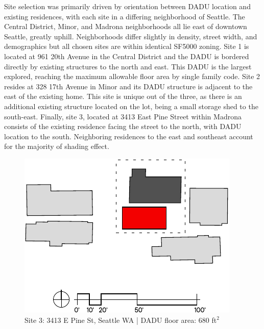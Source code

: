 \documentclass[sagev,times,Royal]{sagej}
\begin{document}
Site selection was primarily driven by orientation between DADU location and existing residences, with each site in a differing neighborhood of Seattle. The Central District, Minor, and Madrona neighborhoods all lie east of downtown Seattle, greatly uphill. Neighborhoods differ slightly in density, street width, and demographics but all chosen sites are within identical SF5000 zoning. Site 1 is located at 961 20th Avenue in the Central District and the DADU is bordered directly by existing structures to the north and east. This DADU is the largest explored, reaching the maximum allowable floor area by single family code\cite{ADUniverseADURules}. Site 2 resides at 328 17th Avenue in Minor and its DADU structure is adjacent to the east of the existing home. This site is unique out of the three, as there is an additional existing structure located on the lot, being a small storage shed to the south-east. Finally, site 3, located at 3413 East Pine Street within Madrona consists of the existing residence facing the street to the north, with DADU location to the south. Neighboring residences to the east and southeast account for the majority of shading effect.

\begin{figure}[h!]
\centering
\includegraphics{site3.pdf}
\caption{Site 3: 3413 E Pine St, Seattle WA | DADU floor area: 680 ft$^2$}
\label{site3-plan}
\end{figure}


\end{document}
